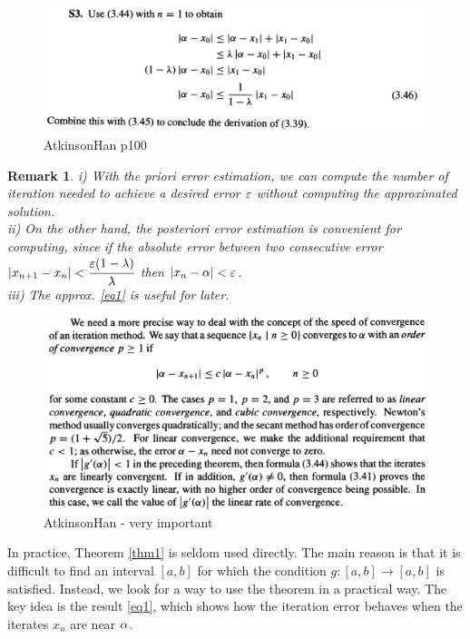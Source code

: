 \documentclass[12pt]{article}
\theoremstyle{theorem}
\newtheorem{rem}{Remark}
\begin{document}
	\begin{figure}[h!]
		\centering
		\includegraphics[scale=1.1]{Figures/screenshot008}
		\caption{AtkinsonHan p100}
		\label{fig:screenshot007}
		\end{figure}

\begin{shaded}
\begin{rem}
i) With the priori error estimation, we can compute the number of iteration needed to achieve a desired error $\varepsilon$ without computing the approximated solution.\\
ii) On the other hand, the posteriori error estimation is convenient for computing, since if the absolute error between two consecutive error 
$|x_{n+1}-x_n|<\cfrac{\varepsilon (1-\lambda)}{\lambda}$ then $|x_n-\alpha|<\varepsilon$.\\
iii) The approx. \eqref{eq1} is useful for later.
\end{rem}
\end{shaded}
%
\begin{figure}[h!]
\centering
\includegraphics[scale=1.2]{Figures/screenshot009}
\caption{AtkinsonHan - very important}
\label{fig:screenshot009}
\end{figure}
%
In practice, Theorem \ref{thm1} is seldom used directly. The main reason is that it is difficult to find an interval $[a,b]$ for which the condition $g:[a,b] \rightarrow [a,b]$ is satisfied. Instead, we look for a way to use the theorem in a practical way. The key idea is the result \eqref{eq1}, which shows how the iteration error behaves when the iterates $x_n$ are near $\alpha$. 
\end{document}
